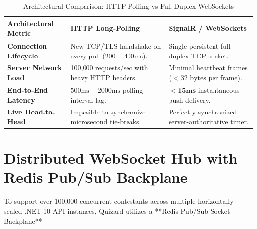 \begin{table}[htbp]
\centering
\footnotesize
\begin{tabular}{|l|p{5.5cm}|p{5.8cm}|}
\hline
\rowcolor{primaryBlue!15}
\textbf{Architectural Metric} & \textbf{HTTP Long-Polling} & \textbf{SignalR / WebSockets} \\ \hline
\textbf{Connection Lifecycle} & New TCP/TLS handshake on every poll ($200-400\text{ms}$). & Single persistent full-duplex TCP socket. \\ \hline
\textbf{Server Network Load} & 100,000 requests/sec with heavy HTTP headers. & Minimal heartbeat frames ($< 32\text{ bytes}$ per frame). \\ \hline
\textbf{End-to-End Latency} & $500\text{ms} - 2000\text{ms}$ polling interval lag. & $\mathbf{< 15\text{ms}}$ instantaneous push delivery. \\ \hline
\textbf{Live Head-to-Head} & Imposible to synchronize microsecond tie-breaks. & Perfectly synchronized server-authoritative timer. \\ \hline
\end{tabular}
\caption{Architectural Comparison: HTTP Polling vs Full-Duplex WebSockets}
\end{table}

\section{Distributed WebSocket Hub with Redis Pub/Sub Backplane}
To support over 100,000 concurrent contestants across multiple horizontally scaled .NET 10 API instances, Quizard utilizes a **Redis Pub/Sub Socket Backplane**:


